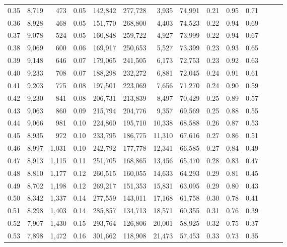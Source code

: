 \begin{tabular}{rrrrrrrrrrrrrr}
0.35 &  8,719 &    473 &  0.05 &  142,842 &  277,728 &   3,935 &  74,991 &  0.21 &  0.95 &      0.71 \\
0.36 &  8,928 &    468 &  0.05 &  151,770 &  268,800 &   4,403 &  74,523 &  0.22 &  0.94 &      0.69 \\
0.37 &  9,078 &    524 &  0.05 &  160,848 &  259,722 &   4,927 &  73,999 &  0.22 &  0.94 &      0.67 \\
0.38 &  9,069 &    600 &  0.06 &  169,917 &  250,653 &   5,527 &  73,399 &  0.23 &  0.93 &      0.65 \\
0.39 &  9,148 &    646 &  0.07 &  179,065 &  241,505 &   6,173 &  72,753 &  0.23 &  0.92 &      0.63 \\
0.40 &  9,233 &    708 &  0.07 &  188,298 &  232,272 &   6,881 &  72,045 &  0.24 &  0.91 &      0.61 \\
0.41 &  9,203 &    775 &  0.08 &  197,501 &  223,069 &   7,656 &  71,270 &  0.24 &  0.90 &      0.59 \\
0.42 &  9,230 &    841 &  0.08 &  206,731 &  213,839 &   8,497 &  70,429 &  0.25 &  0.89 &      0.57 \\
0.43 &  9,063 &    860 &  0.09 &  215,794 &  204,776 &   9,357 &  69,569 &  0.25 &  0.88 &      0.55 \\
0.44 &  9,066 &    981 &  0.10 &  224,860 &  195,710 &  10,338 &  68,588 &  0.26 &  0.87 &      0.53 \\
0.45 &  8,935 &    972 &  0.10 &  233,795 &  186,775 &  11,310 &  67,616 &  0.27 &  0.86 &      0.51 \\
0.46 &  8,997 &  1,031 &  0.10 &  242,792 &  177,778 &  12,341 &  66,585 &  0.27 &  0.84 &      0.49 \\
0.47 &  8,913 &  1,115 &  0.11 &  251,705 &  168,865 &  13,456 &  65,470 &  0.28 &  0.83 &      0.47 \\
0.48 &  8,810 &  1,177 &  0.12 &  260,515 &  160,055 &  14,633 &  64,293 &  0.29 &  0.81 &      0.45 \\
0.49 &  8,702 &  1,198 &  0.12 &  269,217 &  151,353 &  15,831 &  63,095 &  0.29 &  0.80 &      0.43 \\
0.50 &  8,342 &  1,337 &  0.14 &  277,559 &  143,011 &  17,168 &  61,758 &  0.30 &  0.78 &      0.41 \\
0.51 &  8,298 &  1,403 &  0.14 &  285,857 &  134,713 &  18,571 &  60,355 &  0.31 &  0.76 &      0.39 \\
0.52 &  7,907 &  1,430 &  0.15 &  293,764 &  126,806 &  20,001 &  58,925 &  0.32 &  0.75 &      0.37 \\
0.53 &  7,898 &  1,472 &  0.16 &  301,662 &  118,908 &  21,473 &  57,453 &  0.33 &  0.73 &      0.35 \\

\end{tabular}

